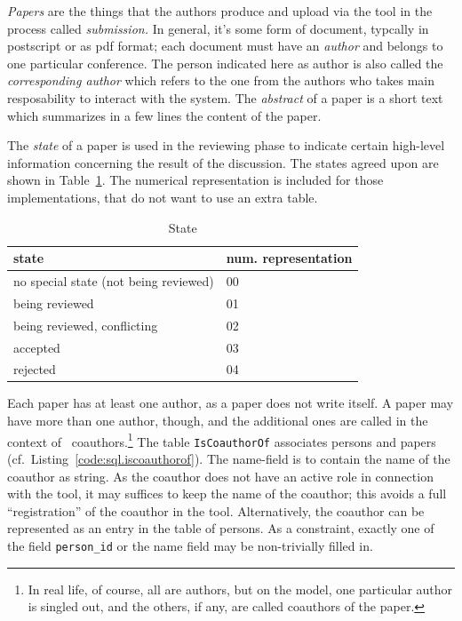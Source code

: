\emph{Papers} are the things that the authors produce and upload via the
tool in the process called \emph{submission.} In general, it's some form of
document, typcally in postscript or as pdf format; each document must have
an \emph{author} and belongs to one particular conference. The person
indicated here as author is also called the \emph{corresponding author}
which refers to the one from the authors who takes main resposability to
interact with the system.
%
The \emph{abstract} of a paper is a short text which summarizes in a few
lines the content of the paper.

%

The \emph{state} of a paper is used in the reviewing phase to indicate
certain high-level information concerning the result of the discussion.
 The states agreed upon are shown in
Table~\ref{tab:paper.state}. The numerical representation is included for
those implementations, that do not want to use an extra table.



\begin{table}[htbp]
  \centering
  \begin{tabular}{ll}
    state & num. representation
    \\\hline
    no special state (not being reviewed) & 00
    \\
    being reviewed
    & 
    01
    \\
    being reviewed, conflicting
    &
    02
    \\
    accepted
    &
    03
    \\
    rejected
    &
    04
  \end{tabular}
  \caption{State}
  \label{tab:paper.state}
\end{table}


Each paper has at least one author, as a paper does not write itself. A paper
may have more than one author, though, and the additional ones are called in
the context of \Coma\ coauthors.\footnote{In real life, of course, all are
  authors, but on the model, one particular author is singled out, and the
  others, if any, are called coauthors of the paper.} 
%
The table \texttt{IsCoauthorOf} associates persons and papers (cf.\ 
Listing~\ref{code:sql.iscoauthorof}). The name-field is to contain the name of
the coauthor as string.  As the coauthor does not have an active role in
connection with the tool, it may suffices to keep the name of the coauthor;
this avoids a full ``registration'' of the coauthor in the tool.
Alternatively, the coauthor can be represented as an entry in the table of
persons. As a constraint, exactly one of the field \texttt{person\_id} or the
name field may be non-trivially filled in.

